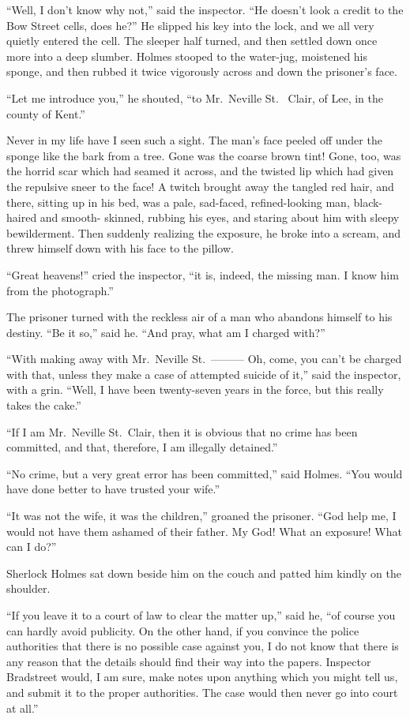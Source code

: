 “Well, I don’t know why not,” said the inspector. “He
doesn’t look a credit to the Bow Street cells, does he?” He
slipped his key into the lock, and we all very quietly entered
the cell. The sleeper half turned, and then settled down once
more into a deep slumber. Holmes stooped to the water-jug,
moistened his sponge, and then rubbed it twice vigorously
across and down the prisoner’s face.

“Let me introduce you,” he shouted, “to Mr.~Nev\-ille St.\ %
Clair, of Lee, in the county of Kent.”

Never in my life have I seen such a sight. The man’s face
peeled off under the sponge like the bark from a tree. Gone
was the coarse brown tint! Gone, too, was the horrid scar
which had seamed it across, and the twisted lip which had
given the repulsive sneer to the face! A twitch brought away
the tangled red hair, and there, sitting up in his bed, was a
pale, sad-faced, refined-looking man, black-haired and smooth-%
skinned, rubbing his eyes, and staring about him with sleepy
bewilderment. Then suddenly realizing the exposure, he broke
into a scream, and threw himself down with his face to the
pillow.

“Great heavens!” cried the inspector, “it is, indeed, the
missing man. I know him from the photograph.”

The prisoner turned with the reckless air of a man who
abandons himself to his destiny. “Be it so,” said he. “And
pray, what am I charged with?”

“With making away with Mr.~Neville St.~--------- Oh, come,
you can’t be charged with that, unless they make a case of
attempted suicide of it,” said the inspector, with a grin.
“Well, I have been twenty-seven years in the force, but this
really takes the cake.”

“If I am Mr.~Neville St.~Clair, then it is obvious that no
crime has been committed, and that, therefore, I am illegally
detained.”

“No crime, but a very great error has been committed,”
said Holmes. “You would have done better to have trusted
your wife.”

“It was not the wife, it was the children,” groaned the prisoner.
“God help me, I would not have them ashamed of
their father. My God! What an exposure! What can I
do?”

Sherlock Holmes sat down beside him on the couch and
patted him kindly on the shoulder.

“If you leave it to a court of law to clear the matter up,”
said he, “of course you can hardly avoid publicity. On the
other hand, if you convince the police authorities that there is
no possible case against you, I do not know that there is any
reason that the details should find their way into the papers.
Inspector Bradstreet would, I am sure, make notes upon anything
which you might tell us, and submit it to the proper authorities.
The case would then never go into court at all.”

